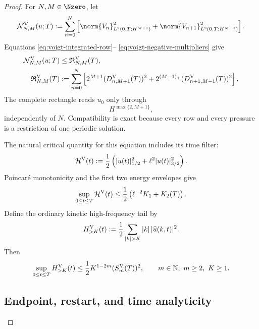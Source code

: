 \begin{proof}
For \(N,M\in\Nzero\), let
\begin{equation}
 \mathcal N_{N,M}^{\rm V}(u;T)
 :=\sum_{n=0}^N\left[
  \norm{V_n}_{L^2(0,T;H^{M+1})}^2
  +\norm{V_{n+1}}_{L^2(0,T;H^{M-1})}^2
 \right].
 \label{eq:voigt-rectangle-norm}
\end{equation}
Equations \eqref{eq:voigt-integrated-row}--
\eqref{eq:voigt-negative-multipliers} give
\begin{align}
 \mathcal N_{N,M}^{\rm V}(u;T)
 &\le\mathfrak R_{N,M}^{\rm V}(T),
 \label{eq:voigt-rectangle-bound}\\
 \mathfrak R_{N,M}^{\rm V}(T)
 &:=\sum_{n=0}^N\left[
  2^{M+1}(D_{n,M+1}^{\rm V}(T))^2
  +2^{(M-1)_+}(D_{n+1,M-1}^{\rm V}(T))^2
 \right].
 \label{eq:voigt-rectangle-envelope}
\end{align}
The complete rectangle reads \(u_0\) only through
\begin{equation}
 H^{\max\{2,M+1\}},
 \label{eq:voigt-rectangle-ledger}
\end{equation}
independently of \(N\).  Compatibility is exact because every row and every
pressure is a restriction of one periodic solution.

The natural critical quantity for this equation includes its time filter:
\begin{equation}
 \mathcal H^{\rm V}(t)
 :=\frac12\left(|u(t)|_{1/2}^2+\ell^2|u(t)|_{3/2}^2\right).
 \label{eq:voigt-filtered-critical-height}
\end{equation}
Poincar\'e monotonicity and the first two energy envelopes give
\begin{equation}
 \sup_{0\le t\le T}\mathcal H^{\rm V}(t)
 \le\frac12\left(\ell^{-2}K_1+K_2(T)\right).
 \label{eq:voigt-filtered-critical-height-bound}
\end{equation}
Define the ordinary kinetic high-frequency tail by
\begin{equation}
 H_{>K}^{\rm V}(t)
 :=\frac12\sum_{|k|>K}|k|\,|\widehat u(k,t)|^2.
 \label{eq:voigt-frequency-tail-definition}
\end{equation}
Then
\begin{equation}
 \sup_{0\le t\le T}H_{>K}^{\rm V}(t)
 \le\frac12K^{1-2m}(S_m^{\rm V}(T))^2,
 \qquad m\in\mathbb N,\ m\ge2,\ K\ge1.
 \label{eq:voigt-frequency-tail}
\end{equation}

\subsection{Endpoint, restart, and time analyticity}


\end{proof}
